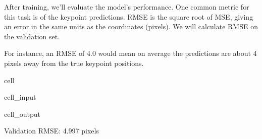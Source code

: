 \documentclass[letterpaper,10pt,english]{jupyterBook}
\begin{document}
\sphinxAtStartPar
After training, we’ll evaluate the model’s performance. One common metric for this task is  of the keypoint predictions. RMSE is the square root of MSE, giving an error in the same units as the coordinates (pixels). We will calculate RMSE on the validation set.

\sphinxAtStartPar
For instance, an RMSE of 4.0 would mean on average the predictions are about 4 pixels away from the true keypoint positions.

\begin{sphinxuseclass}{cell}\begin{sphinxVerbatimInput}

\begin{sphinxuseclass}{cell_input}
\begin{sphinxVerbatim}[commandchars=\\\{\}]

 
      

    
    
  
\end{sphinxVerbatim}

\end{sphinxuseclass}\end{sphinxVerbatimInput}
\begin{sphinxVerbatimOutput}

\begin{sphinxuseclass}{cell_output}
\begin{sphinxVerbatim}[commandchars=\\\{\}]
Validation RMSE: 4.997 pixels
\end{sphinxVerbatim}

\end{sphinxuseclass}\end{sphinxVerbatimOutput}

\end{sphinxuseclass}
\sphinxAtStartPar
{}
\end{document}
